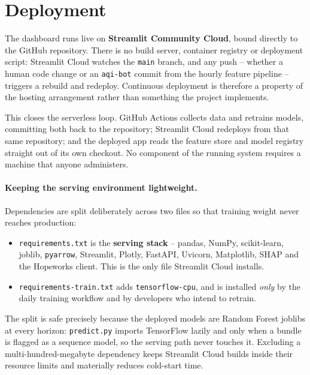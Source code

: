 \documentclass[11pt,a4paper]{article}
\begin{document}
\section{Deployment}

The dashboard runs live on \textbf{Streamlit Community Cloud}, bound directly
to the GitHub repository. There is no build server, container registry or
deployment script: Streamlit Cloud watches the \texttt{main} branch, and any
push -- whether a human code change or an \texttt{aqi-bot} commit from the
hourly feature pipeline -- triggers a rebuild and redeploy. Continuous
deployment is therefore a property of the hosting arrangement rather than
something the project implements.

This closes the serverless loop. GitHub Actions collects data and retrains
models, committing both back to the repository; Streamlit Cloud redeploys from
that same repository; and the deployed app reads the feature store and model
registry straight out of its own checkout. No component of the running system
requires a machine that anyone administers.

\paragraph{Keeping the serving environment lightweight.}
Dependencies are split deliberately across two files so that training weight
never reaches production:

\begin{itemize}[itemsep=2pt]
  \item \texttt{requirements.txt} is the \textbf{serving stack} -- pandas,
        NumPy, scikit-learn, joblib, \texttt{pyarrow}, Streamlit, Plotly,
        FastAPI, Uvicorn, Matplotlib, SHAP and the Hopsworks client. This is
        the only file Streamlit Cloud installs.
  \item \texttt{requirements-train.txt} adds \texttt{tensorflow-cpu}, and is
        installed \emph{only} by the daily training workflow and by developers
        who intend to retrain.
\end{itemize}

The split is safe precisely because the deployed models are Random Forest
joblibs at every horizon: \texttt{predict.py} imports TensorFlow lazily and
only when a bundle is flagged as a sequence model, so the serving path never
touches it. Excluding a multi-hundred-megabyte dependency keeps Streamlit
Cloud builds inside their resource limits and materially reduces cold-start
time.
\end{document}
